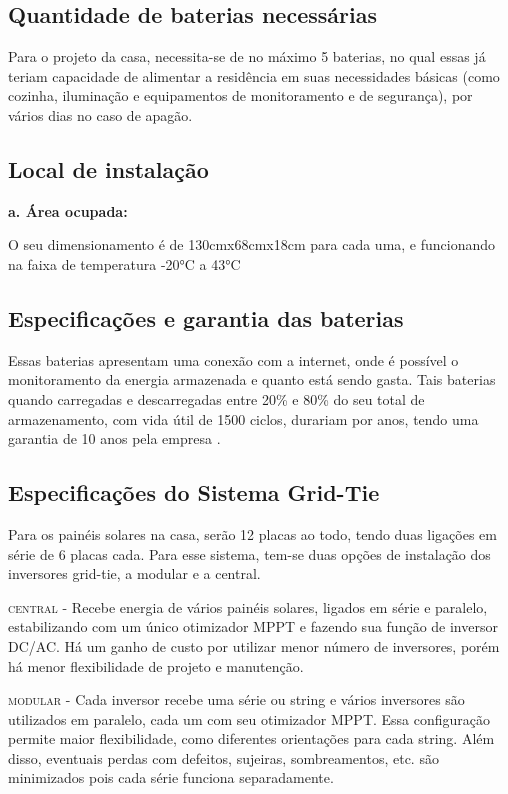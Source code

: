 \subsection{Quantidade de baterias necessárias}

	Para o projeto da casa, necessita-se de no máximo 5 baterias, no qual essas já teriam capacidade de alimentar a residência em suas necessidades básicas (como cozinha, iluminação e equipamentos de monitoramento e de segurança), por vários dias no caso de apagão.

\subsection{Local de instalação}

\textbf{a. Área ocupada:}

	O seu dimensionamento é de 130cmx68cmx18cm para cada uma, e funcionando na faixa de temperatura -20°C a 43°C \cite{TESLA}

\subsection{Especificações e garantia das baterias}

	Essas baterias apresentam uma conexão com a internet, onde é possível o monitoramento da energia armazenada e quanto está sendo gasta. Tais baterias quando carregadas e descarregadas entre 20\% e 80\% do seu total de armazenamento, com vida útil de 1500 ciclos, durariam por anos, tendo uma garantia de 10 anos pela empresa \cite{TESLA}.

\subsection{Especificações do Sistema Grid-Tie}

	Para os painéis solares na casa, serão 12 placas ao todo, tendo duas ligações em série de 6 placas cada. Para esse sistema, tem-se duas opções de instalação dos inversores grid-tie, a modular e a central.

	\textsc{central} - Recebe energia de vários painéis solares, ligados em série e paralelo, estabilizando com um único otimizador MPPT e fazendo sua função de inversor DC/AC. Há um ganho de custo por utilizar menor número de inversores, porém há menor flexibilidade de projeto e manutenção.

	\textsc{modular} - Cada inversor recebe uma série ou string e vários inversores são utilizados em paralelo, cada um com seu otimizador MPPT. Essa configuração permite maior flexibilidade, como diferentes orientações para cada string. Além disso, eventuais perdas com defeitos, sujeiras, sombreamentos, etc. são minimizados pois cada série funciona separadamente.

